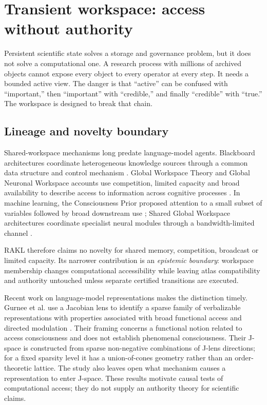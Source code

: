 \section{Transient workspace: access without authority}

Persistent scientific state solves a storage and governance problem, but it does not solve a computational one. A research process with millions of archived objects cannot expose every object to every operator at every step. It needs a bounded active view. The danger is that ``active'' can be confused with ``important,'' then ``important'' with ``credible,'' and finally ``credible'' with ``true.'' The workspace is designed to break that chain.

\subsection{Lineage and novelty boundary}

Shared-workspace mechanisms long predate language-model agents. Blackboard architectures coordinate heterogeneous knowledge sources through a common data structure and control mechanism \cite{hayesroth1985,nii1986}. Global Workspace Theory and Global Neuronal Workspace accounts use competition, limited capacity and broad availability to describe access to information across cognitive processes \cite{baars1988,dehaene2001,mashour2020}. In machine learning, the Consciousness Prior proposed attention to a small subset of variables followed by broad downstream use \cite{bengio2017}; Shared Global Workspace architectures coordinate specialist neural modules through a bandwidth-limited channel \cite{goyal2021}.

RAKL therefore claims no novelty for shared memory, competition, broadcast or limited capacity. Its narrower contribution is an \emph{epistemic boundary}: workspace membership changes computational accessibility while leaving atlas compatibility and authority untouched unless separate certified transitions are executed.

Recent work on language-model representations makes the distinction timely. Gurnee et al. use a Jacobian lens to identify a sparse family of verbalizable representations with properties associated with broad functional access and directed modulation \cite{gurnee2026}. Their framing concerns a functional notion related to access consciousness and does not establish phenomenal consciousness. Their J-space is constructed from sparse non-negative combinations of J-lens directions; for a fixed sparsity level it has a union-of-cones geometry rather than an order-theoretic lattice. The study also leaves open what mechanism causes a representation to enter J-space. These results motivate causal tests of computational access; they do not supply an authority theory for scientific claims.

